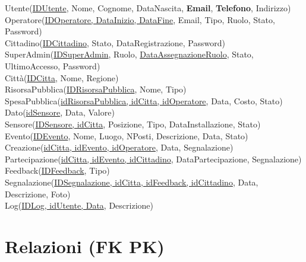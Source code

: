 \documentclass{article}
\begin{document}
	Utente(\underline{IDUtente}, Nome, Cognome, DataNascita, \textbf{Email}, \textbf{Telefono}, Indirizzo)\\
	Operatore(\underline{IDOperatore, DataInizio, DataFine}, Email, Tipo, Ruolo, Stato, Password)\\
	Cittadino(\underline{IDCittadino}, Stato, DataRegistrazione, Password)\\
	SuperAdmin(\underline{IDSuperAdmin}, Ruolo, \underline{DataAssegnazioneRuolo}, Stato, UltimoAccesso, Password)\\
	Città(\underline{IDCitta}, Nome, Regione)\\
	RisorsaPubblica(\underline{IDRisorsaPubblica}, Nome, Tipo)\\
	SpesaPubblica(\underline{idRisorsaPubblica, idCitta, idOperatore}, Data, Costo, Stato)\\
	Dato(\underline{idSensore}, Data, Valore)\\
	Sensore(\underline{IDSensore, idCitta}, Posizione, Tipo, DataInstallazione, Stato)\\
	Evento(\underline{IDEvento}, Nome, Luogo, NPosti, Descrizione, Data, Stato)\\
	Creazione(\underline{idCitta, idEvento, idOperatore}, Data, Segnalazione)\\
	Partecipazione(\underline{idCitta, idEvento, idCittadino}, DataPartecipazione, Segnalazione)\\
	Feedback(\underline{IDFeedback}, Tipo)\\
	Segnalazione(\underline{IDSegnalazione, idCitta, idFeedback, idCittadino}, Data, Descrizione, Foto)\\
	Log(\underline{IDLog, idUtente, Data}, Descrizione)\\
	
	
	\section*{Relazioni (FK \faLongArrowRight\space PK)}
	\small %
	
\end{document}
